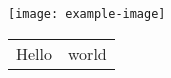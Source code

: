 \documentclass{article}
\makeatletter
\newcommand\figcaption{\def\@captype{figure}\caption}
\newcommand\tabcaption{\def\@captype{table}\caption}
\makeatother
\begin{document}
\begin{figtab}
  \begin{minipage}[b]{0.45\linewidth}
    \centering
    \texttt{[image: example-image]}
    \figcaption{Example Image}
  \end{minipage}\quad
  \begin{minipage}[b]{0.45\linewidth}
    \centering
    \tabcaption{Example Tabular}
    \begin{tabular}{cc}
      Hello & world
    \end{tabular}
  \end{minipage}
\end{figtab}
\end{document}

